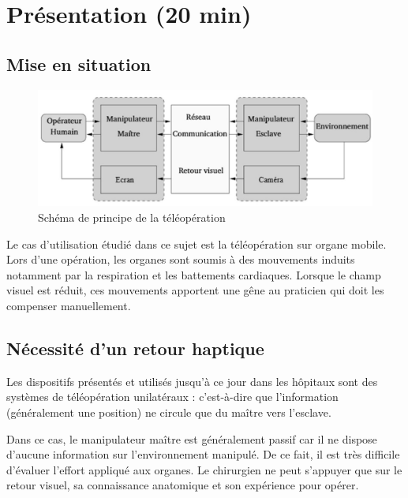 

\section{Présentation (20 min)}

\subsection{Mise en situation}

\begin{figure}[ht!]
\begin{center}
 \includegraphics[width=0.9\linewidth]{img/Figure1}
\end{center}
\caption{Schéma de principe de la téléopération}
\label{fig1}
\end{figure}

Le cas d'utilisation étudié dans ce sujet est la téléopération sur organe mobile. Lors d'une opération, les organes sont soumis à des mouvements induits notamment par la respiration et les battements cardiaques. Lorsque le champ visuel est réduit, ces mouvements apportent une gêne au praticien qui doit les compenser manuellement.

\subsection{Nécessité d'un retour haptique}

Les dispositifs présentés et utilisés jusqu'à ce jour dans les hôpitaux sont des systèmes de téléopération unilatéraux : c'est-à-dire que l'information (généralement une position) ne circule que du maître vers l'esclave.

Dans ce cas, le manipulateur maître est généralement passif car il ne dispose d'aucune information sur l'environnement manipulé. De ce fait, il est très difficile d'évaluer l'effort appliqué aux organes. Le chirurgien ne peut s'appuyer que sur le retour visuel, sa connaissance anatomique et son expérience pour  opérer.


